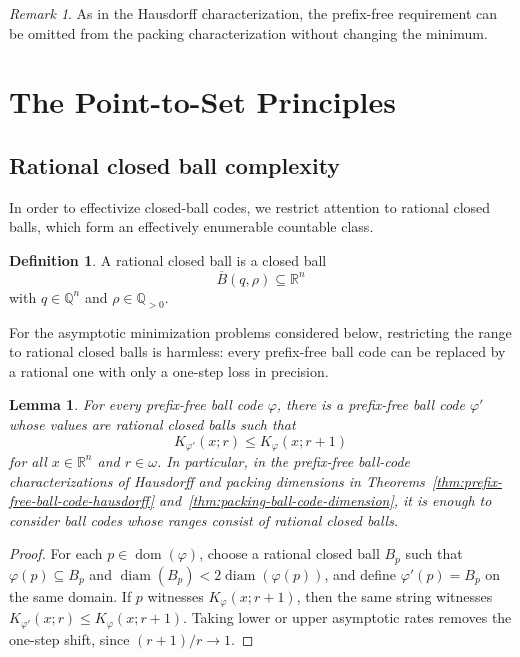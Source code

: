 \documentclass[a4paper,oneside,reqno,12pt]{amsart}
\theoremstyle{plain}
\newtheorem{lemma}[theorem]{Lemma}
\theoremstyle{definition}
\newtheorem{definition}[theorem]{Definition}
\theoremstyle{remark}
\newtheorem{remark}[theorem]{Remark}
\DeclareMathOperator{\dom}{dom}
\DeclareMathOperator{\diam}{diam}
\begin{document}
\begin{remark}
As in the Hausdorff characterization, the prefix-free requirement can be
omitted from the packing characterization without changing the minimum.
\end{remark}



\section{The Point-to-Set Principles}
\label{sec:point-to-set-principles}

\subsection{Rational closed ball complexity}

In order to effectivize closed-ball codes,
we restrict attention to rational closed balls,
which form an effectively enumerable countable class.

\begin{definition}
\label{def:rational-closed-ball}
A rational closed ball is a closed ball
\[
\overline B(q,\rho)\subseteq \mathbb R^n
\]
with \(q\in\mathbb Q^n\) and \(\rho\in\mathbb Q_{>0}\).
\end{definition}

For the asymptotic minimization problems considered below, restricting the
range to rational closed balls is harmless: every prefix-free ball code can
be replaced by a rational one with only a one-step loss in precision.

\begin{lemma}
\label{lem:rationalize-prefix-free-ball-code}
For every prefix-free ball code \(\varphi\), there is a prefix-free ball code
\(\varphi'\) whose values are rational closed balls such that
\[
K_{\varphi'}(x;r)
\le
K_\varphi(x;r+1)
\]
for all \(x\in\mathbb R^n\) and \(r\in\omega\).  In particular, in the
prefix-free ball-code characterizations of Hausdorff and packing dimensions in
Theorems~\ref{thm:prefix-free-ball-code-hausdorff}
and~\ref{thm:packing-ball-code-dimension}, it is enough to consider ball codes
whose ranges consist of rational closed balls.
\end{lemma}

\begin{proof}
For each \(p\in\dom(\varphi)\), choose a rational closed ball \(B_p\) such that
\(\varphi(p)\subseteq B_p\) and
\(\diam(B_p)<2\diam(\varphi(p))\), and define \(\varphi'(p)=B_p\) on the same
domain.  If \(p\) witnesses \(K_\varphi(x;r+1)\), then the same string witnesses
\(K_{\varphi'}(x;r)\le K_\varphi(x;r+1)\).
Taking lower or upper asymptotic rates removes the one-step shift, since
\((r+1)/r\to1\).
\end{proof}
\end{document}
